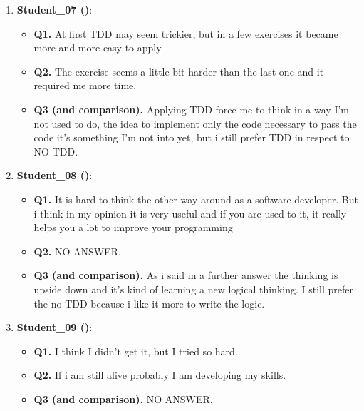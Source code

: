 \begin{enumerate}
    \item \textbf{Student\_07 (\tdd)}:
    \begin{itemize}
        \item \textbf{Q1.} At first TDD may seem trickier, but in a few exercises it became more and more easy to apply  
        \item \textbf{Q2.} The exercise seems a little bit harder than the last one and it required me more time.
        \item \textbf{Q3 (\tdd and \notdd comparison).} Applying TDD force me to think in a way I’m not used to do, the idea to implement only the code necessary to pass the code it's something I’m not into yet, but i still prefer TDD in respect to NO-TDD.
    \end{itemize}

    \item \textbf{Student\_08 (\tdd)}:
    \begin{itemize}
        \item \textbf{Q1.} It is hard to think the other way around as a software developer. But i think in my opinion it is very useful and if you are used to it, it really helps you a lot to improve your programming
        \item \textbf{Q2.} NO ANSWER.
        \item \textbf{Q3 (\tdd and \notdd comparison).} As i said in a further answer the thinking is upside down and it’s kind of learning a new logical thinking. I still prefer the no-TDD because i like it more to write the logic.
    \end{itemize}

    \item \textbf{Student\_09 (\tdd)}:
    \begin{itemize}
        \item \textbf{Q1.} I think I didn’t get it, but I tried so hard.
        \item \textbf{Q2.} If i am still alive probably I am developing my skills.
        \item \textbf{Q3 (\tdd and \notdd comparison).} NO ANSWER,
    \end{itemize}
\end{enumerate}
